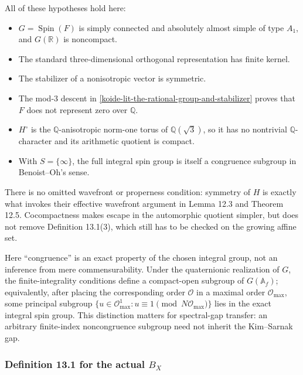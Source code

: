 All of these hypotheses hold here:

\begin{itemize}

\item
  \(G=\operatorname{Spin}(F)\) is simply connected and absolutely almost simple of type \(A_1\), and \(G(\mathbb R)\) is noncompact.
\item
  The standard three-dimensional orthogonal representation has finite kernel.
\item
  The stabilizer of a nonisotropic vector is symmetric.
\item
  The mod-\(3\) descent in
  \cref{koide-lit-the-rational-group-and-stabilizer} proves that \(F\) does
  not represent zero over \(\mathbb Q\).
\item
  \(H^\circ\) is the \(\mathbb Q\)-anisotropic norm-one torus of \(\mathbb Q(\sqrt3)\), so it has no nontrivial \(\mathbb Q\)-character and its arithmetic quotient is compact.
\item
  With \(S=\{\infty\}\), the full integral spin group is itself a congruence subgroup in Benoist--Oh's sense.
\end{itemize}

There is no omitted wavefront or properness condition: symmetry of \(H\) is exactly what invokes their effective wavefront argument in Lemma 12.3 and Theorem 12.5. Cocompactness makes escape in the automorphic quotient simpler, but does not remove Definition 13.1(3), which still has to be checked on the growing affine set.

Here ``congruence'' is an exact property of the chosen integral group, not an inference from mere commensurability. Under the quaternionic realization of \(G\), the finite-integrality conditions define a compact-open subgroup of \(G(\mathbb A_f)\); equivalently, after placing the corresponding order \(\mathcal O\) in a maximal order \(\mathcal O_{\max}\), some principal subgroup \(\{u\in\mathcal O_{\max}^1:u\equiv1\pmod{N\mathcal O_{\max}}\}\) lies in the exact integral spin group. This distinction matters for spectral-gap transfer: an arbitrary finite-index noncongruence subgroup need not inherit the Kim--Sarnak gap.

\subsubsection{\texorpdfstring{Definition 13.1 for the actual \(B_X\)}{Definition 13.1 for the actual B\_X}}\label{koide-lit-definition-13.1-for-the-actual-b_x}

